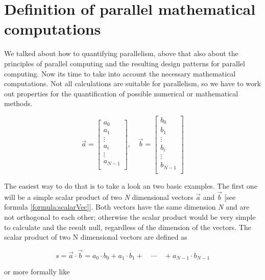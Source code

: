\section{Definition of parallel mathematical computations}\label{chap:mathComp}

We talked about how to quantifying parallelism, above that also about the principles of parallel computing and the resulting design patterns for parallel computing. Now its time to take into account the necessary mathematical computations. Not all calculations are suitable for parallelism, so we have to work out properties for the quantification of possible numerical or mathematical methods. 

\begin{equation} \label{formula:scalarVec}
\vec{a} = \begin{bmatrix}
a_{0} \\
a_{1} \\
\vdots \\
a_{i} \\
\vdots \\
a_{N - 1} \\
\end{bmatrix} ,\quad \vec{b} = \begin{bmatrix}
b_{0} \\
b_{1} \\
\vdots \\
b_{i} \\
\vdots \\
b_{N - 1} \\
\end{bmatrix}
\end{equation}

The easiest way to do that is to take a look an two basic examples. The first one will be a simple scalar product of two \textit{N} dimensional vectors $\vec{a}$ and $\vec{b}$ [see formula \ref{formula:scalarVec}]. Both vectors have the same dimension \textit{N} and are not orthogonal to each other; otherwise the scalar product would be very simple to calculate and the result null, regardless of the dimension of the vectors. The scalar product of two N dimensional vectors are defined as

\begin{equation} \label{formula:scalarProdEasy}
	s = \vec{a} \cdot \vec{b} = a_0 \cdot b_0 + a_1 \cdot b_1 + \quad \cdots \quad + a_{N - 1} \cdot b_{N - 1}
\end{equation}

\noindent or more formally like


